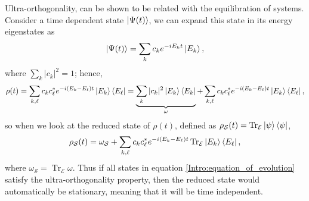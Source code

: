 \indent Ultra-orthogonality, can be shown to be related with the equilibration of systems. Consider a time dependent state $\mathinner{|{\Psi(t)}\rangle}$, we can expand this state in its energy eigenstates as
\begin{equation}
\mathinner{|{\Psi(t)}\rangle}=\sum_{k} c_k e^{-iE_kt}\mathinner{|{E_k}\rangle},
\end{equation}
where $\sum_k|c_k|^2=1$; hence,
\begin{equation}
\rho(t) = \sum_{ k,\ell}c_kc^*_\ell e^{-i(E_k-E_\ell)t}\mathinner{|{E_k}\rangle}\mathinner{\langle{E_\ell}|} = \underbrace{\sum_{ k}|c_k|^2 \mathinner{|{E_k}\rangle}\mathinner{\langle{E_k}|}}_{\omega}+\sum_{ k,\ell}c_kc^*_\ell e^{-i(E_k-E_\ell)t}\mathinner{|{E_k}\rangle}\mathinner{\langle{E_\ell}|},
\end{equation}
so when we look at the reduced state of $\rho(t)$, defined as  $ \rho_{\mathcal{S}}(t) = \operatorname{Tr}_{\mathcal{E}} \mathinner{|{\psi}\rangle}\mathinner{\langle{\psi}|}$,
\begin{equation}
\rho_{\mathcal{S}}(t) =\omega_{\mathcal{S}} + \sum_{ k,\ell}c_kc^*_\ell e^{-i(E_k-E_\ell)t}\operatorname{Tr}_{\mathcal{E}}\mathinner{|{E_k}\rangle}\mathinner{\langle{E_\ell}|},
\label{Intro:equation_of_evolution}
\end{equation}
where $\omega_{\mathcal{S}} = \operatorname{Tr}_{\mathcal{E}} \omega$.  Thus if all states in equation \eqref{Intro:equation_of_evolution} satisfy the ultra-orthogonality property, then the reduced state would automatically be stationary, meaning that it will be time independent.\\



